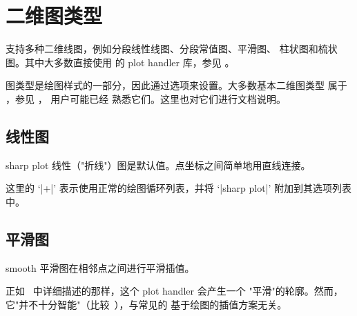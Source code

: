 
\section{二维图类型}

{%

\PGFPlots{} 支持多种二维线图，例如分段线性线图、分段常值图、平滑图、
柱状图和梳状图。其中大多数直接使用 \PGF{} 的 plot handler 库，参见
\cite[Section~18.8]{tikz}。

图类型是绘图样式的一部分，因此通过选项来设置。大多数基本二维图类型
属于 \Tikz{}，参见 \cite[Section~18.8]{tikz}，\Tikz{} 用户可能已经
熟悉它们。这里也对它们进行文档说明。


\subsection{线性图}

\begin{plottype}{sharp plot}
    线性（"折线"）图是默认值。点坐标之间简单地用直线连接。
\begin{codeexample}[]
\end{codeexample}

    这里的 `|+|' 表示使用正常的绘图循环列表，并将 `|sharp plot|'
    附加到其选项列表中。
\end{plottype}


\subsection{平滑图}

\begin{plottype}{smooth}
    平滑图在相邻点之间进行平滑插值。
\begin{codeexample}[]
\end{codeexample}
\end{plottype}

正如~\cite{tikz} 中详细描述的那样，这个 plot handler 会产生一个
"平滑"的轮廓。然而，它"并不十分智能"（比较~\cite{tikz}），与常见的
基于绘图的插值方案无关。

}
